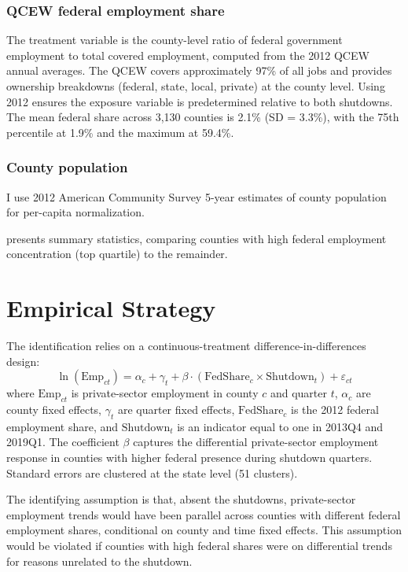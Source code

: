 \documentclass[12pt]{article}
\begin{document}
\subsubsection*{QCEW federal employment share} The treatment variable is the county-level ratio of federal government employment to total covered employment, computed from the 2012 QCEW annual averages. The QCEW covers approximately 97\% of all jobs and provides ownership breakdowns (federal, state, local, private) at the county level. Using 2012 ensures the exposure variable is predetermined relative to both shutdowns. The mean federal share across 3,130 counties is 2.1\% (SD = 3.3\%), with the 75th percentile at 1.9\% and the maximum at 59.4\%.

\subsubsection*{County population} I use 2012 American Community Survey 5-year estimates of county population for per-capita normalization.

 presents summary statistics, comparing counties with high federal employment concentration (top quartile) to the remainder.



\section{Empirical Strategy}

The identification relies on a continuous-treatment difference-in-differences design:
\begin{equation}
\ln(\text{Emp}_{ct}) = \alpha_c + \gamma_t + \beta \cdot (\text{FedShare}_c \times \text{Shutdown}_t) + \varepsilon_{ct}
\label{eq:main}
\end{equation}
where $\text{Emp}_{ct}$ is private-sector employment in county $c$ and quarter $t$, $\alpha_c$ are county fixed effects, $\gamma_t$ are quarter fixed effects, $\text{FedShare}_c$ is the 2012 federal employment share, and $\text{Shutdown}_t$ is an indicator equal to one in 2013Q4 and 2019Q1. The coefficient $\beta$ captures the differential private-sector employment response in counties with higher federal presence during shutdown quarters. Standard errors are clustered at the state level (51 clusters).

The identifying assumption is that, absent the shutdowns, private-sector employment trends would have been parallel across counties with different federal employment shares, conditional on county and time fixed effects. This assumption would be violated if counties with high federal shares were on differential trends for reasons unrelated to the shutdown.
\end{document}
